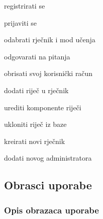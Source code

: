 			
			\begin{packed_enum}
				\item  {}
				
				\begin{packed_enum}
					
					\item registrirati se
					\item prijaviti se
%						
%				
					\item odabrati rječnik i mod učenja
					\item odgovarati na pitanja
					\item obrisati svoj korisnički račun
					
				\end{packed_enum}
			
				\item  {}
				
				\begin{packed_enum}
					
					\item dodati riječ u rječnik
					\item urediti komponente riječi
					\item ukloniti riječ iz baze
					\item kreirati novi rječnik
					\item dodati novog administratora
										
				\end{packed_enum}
			\end{packed_enum}
			
			\eject 
			
			
				
			\subsection{Obrasci uporabe}
				
				
				\subsubsection{Opis obrazaca uporabe}
					

